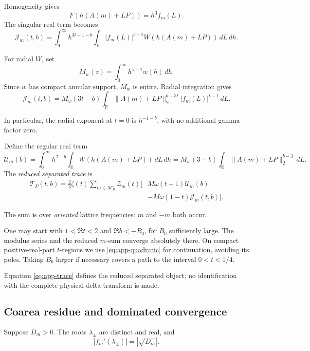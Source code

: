 \documentclass[11pt]{article}
\begin{document}
Homogeneity gives
\[
F(h(A(m)+LP))=h^3f_m(L).
\]
The singular real term becomes
\begin{equation}\label{eq:app-J}
\mathcal J_m(t,b)=
\int_0^\infty h^{3t-1-b}
\int_{\mathbb R}
|f_m(L)|^{t-1}
W(h(A(m)+LP))\,dL\,dh.
\end{equation}

For radial $W$, set
\[
M_w(z)=\int_0^\infty h^{z-1}w(h)\,dh.
\]
Since $w$ has compact annular support,
$M_w$ is entire. Radial integration gives
\begin{equation}\label{eq:app-radial}
\boxed{
\mathcal J_m(t,b)=
M_w(3t-b)
\int_{\mathbb R}
\|A(m)+LP\|_2^{b-3t}
|f_m(L)|^{t-1}\,dL.
}
\end{equation}

In particular, the radial exponent at
$t=0$ is $h^{-1-b}$, with no additional
gamma-factor zero.

Define the regular real term
\[
\mathcal U_m(b)=
\int_0^\infty h^{2-b}
\int_{\mathbb R}W(h(A(m)+LP))\,dL\,dh
=M_w(3-b)\int_{\mathbb R}\|A(m)+LP\|_2^{b-3}\,dL.
\]
The \emph{reduced separated trace} is
\begin{equation}\label{eq:app-trace}
\boxed{
\begin{aligned}
\mathcal T_P(t,b)
=\frac23\zeta(t)
\sum_{m\in\mathcal M_P^\circ}
\mathcal Z_m(t)
\bigl[
&M\omega(t-1)\mathcal U_m(b)\\
&-M\omega(1-t)\mathcal J_m(t,b)
\bigr].
\end{aligned}}
\end{equation}

The sum is over \emph{oriented} lattice
frequencies: $m$ and $-m$ both occur.

One may start with $1<\Re t<2$ and $\Re b<-B_0$, for
$B_0$ sufficiently large. The modulus series and the reduced
$m$-sum converge absolutely there. On compact positive-real-part
$t$-regions we use \eqref{eq:app-quadratic} for continuation, avoiding
its poles. Taking $B_0$ larger if necessary covers a path to the
interval $0<t<1/4$.

Equation \eqref{eq:app-trace} defines the
reduced separated object; no identification
with the complete physical delta transform
is made.

\subsection{Coarea residue and dominated convergence}

Suppose $D_m>0$. The roots $\lambda_\pm$
are distinct and real, and
\[
|f_m'(\lambda_\pm)|=|\sqrt{D_m}|.
\]
\end{document}
